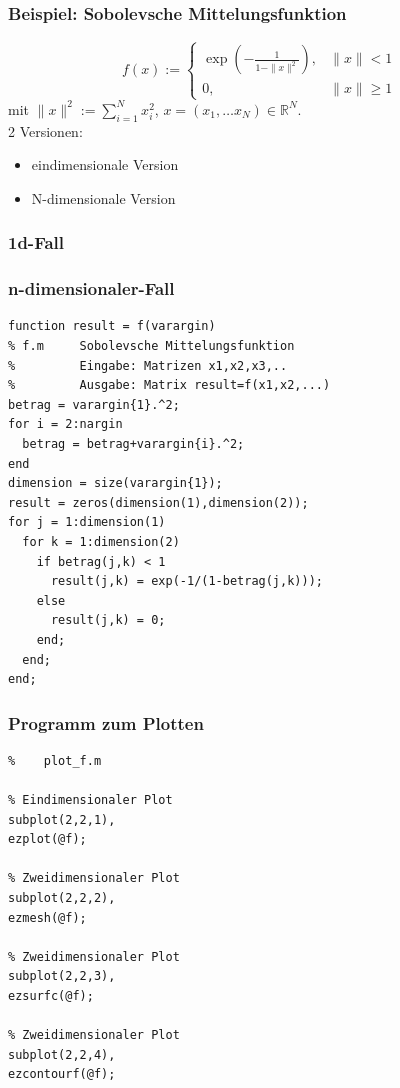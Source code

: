 \documentclass[hyperref={xetex}]{beamer}
\begin{document}
%
%
\begin{frame}[fragile]\frametitle{Beispiel: Sobolevsche Mittelungsfunktion}
\alert{ \[ f(x) := \left \{ \begin{array}{ll} \exp(- \frac{1}{1-\|x\|^2}), &
\|x \| <1 \\ 0, & \|x \| \geq 1 
\end{array} \right .  
\]}
mit $\|x\|^2:=\sum_{i=1}^N x_i^2$, $x=(x_1, \dots x_N) \in
\mathbb{R}^N$.\\[0.5cm]

2 Versionen:
\begin{itemize}
\item eindimensionale Version
\item N-dimensionale Version
\end{itemize}
\end{frame}
%
%
\begin{frame}[fragile]\frametitle{1d-Fall}

\end{frame}
%
%
\begin{frame}[fragile]\frametitle{n-dimensionaler-Fall}
\begin{lstlisting}
function result = f(varargin)
% f.m     Sobolevsche Mittelungsfunktion
%         Eingabe: Matrizen x1,x2,x3,..
%         Ausgabe: Matrix result=f(x1,x2,...)
betrag = varargin{1}.^2;
for i = 2:nargin
  betrag = betrag+varargin{i}.^2;
end
dimension = size(varargin{1});
result = zeros(dimension(1),dimension(2));
for j = 1:dimension(1)
  for k = 1:dimension(2)
    if betrag(j,k) < 1
      result(j,k) = exp(-1/(1-betrag(j,k)));
    else
      result(j,k) = 0;
    end;
  end;
end;
\end{lstlisting}
\end{frame}
%
%
\begin{frame}[fragile]\frametitle{Programm zum Plotten}
\begin{lstlisting}
%    plot_f.m

% Eindimensionaler Plot
subplot(2,2,1),
ezplot(@f);

% Zweidimensionaler Plot
subplot(2,2,2),
ezmesh(@f);

% Zweidimensionaler Plot
subplot(2,2,3),
ezsurfc(@f);

% Zweidimensionaler Plot
subplot(2,2,4),
ezcontourf(@f);
\end{lstlisting}
\end{frame}
\end{document}
